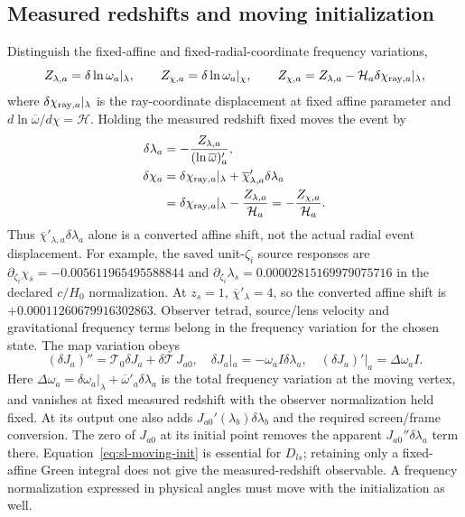 \subsection{Measured redshifts and moving initialization}
Distinguish the fixed-affine and fixed-radial-coordinate frequency
variations,
\begin{equation}
 Z_{\lambda,a}=\delta\ln\omega_a|_\lambda,
 \qquad Z_{\chi,a}=\delta\ln\omega_a|_\chi,
 \qquad
 Z_{\chi,a}=Z_{\lambda,a}
 -\mathcal H_a\delta\chi_{{\rm ray},a}|_\lambda,
 \label{eq:sl-frequency-chain}
\end{equation}
where $\delta\chi_{{\rm ray},a}|_\lambda$ is the ray-coordinate
displacement at fixed affine parameter and
$d\ln\overline\omega/d\chi=\mathcal H$. Holding the measured redshift
fixed moves the event by
\begin{align}
 \delta\lambda_a&=-\frac{Z_{\lambda,a}}{(\ln\overline\omega)'_a},
 \nonumber\\
 \delta\chi_a&=\delta\chi_{{\rm ray},a}|_\lambda
 +\overline\chi'_{\lambda,a}\delta\lambda_a
 \nonumber\\
 &=\delta\chi_{{\rm ray},a}|_\lambda-\frac{Z_{\lambda,a}}{\mathcal H_a}
 =-\frac{Z_{\chi,a}}{\mathcal H_a}.
 \label{eq:sl-endpoint}
\end{align}
Thus $\overline\chi'_{\lambda,a}\delta\lambda_a$ alone is a converted
affine shift, not the actual radial event displacement. For example, the
saved unit-$\zeta_i$ source responses are
$\partial_{\zeta_i}\chi_s=-0.005611965495588844$ and
$\partial_{\zeta_i}\lambda_s=0.00002815169979075716$ in the declared
$c/H_0$ normalization. At $z_s=1$, $\overline\chi'_\lambda=4$,
so the converted affine shift is $+0.00011260679916302863$.
Observer tetrad, source/lens velocity and gravitational frequency terms
belong in the frequency variation for the chosen state. The map variation obeys
\begin{equation}
 (\delta J_a)''=\mathcal T_0\delta J_a+\delta\mathcal T\,J_{a0},
 \quad
 \delta J_a|_a=-\omega_a I\delta\lambda_a,
 \quad (\delta J_a)'|_a=\Delta\omega_a I.
 \label{eq:sl-moving-init}
\end{equation}
Here $\Delta\omega_a=\delta\omega_a|_\lambda
+\overline\omega'_a\delta\lambda_a$ is the total frequency variation
at the moving vertex, and vanishes at fixed measured redshift with the
observer normalization held fixed.
At its output one also adds $J_{a0}'(\lambda_b)\delta\lambda_b$ and the
required screen/frame conversion. The zero of $J_{a0}$ at its initial
point removes the apparent $J_{a0}''\delta\lambda_a$ term there.
Equation~\eqref{eq:sl-moving-init} is essential for $D_{ls}$; retaining
only a fixed-affine Green integral does not give the measured-redshift
observable. A frequency normalization expressed in physical angles must
move with the initialization as well.

